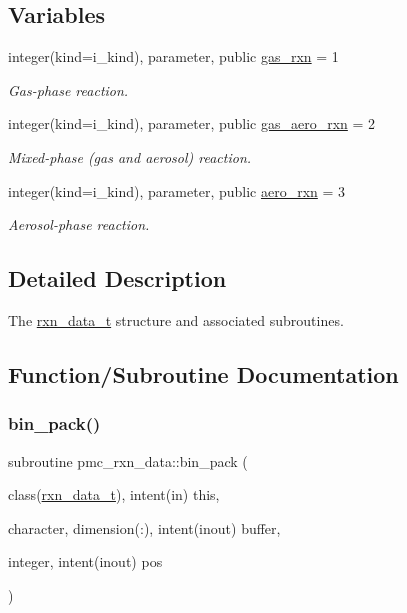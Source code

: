 \subsection*{Variables}
\begin{DoxyCompactItemize}
\item 
integer(kind=i\+\_\+kind), parameter, public \mbox{\hyperlink{namespacepmc__rxn__data_a111b121911199623f10770744af6488f}{gas\+\_\+rxn}} = 1
\begin{DoxyCompactList}\small\item\em Gas-\/phase reaction. \end{DoxyCompactList}\item 
integer(kind=i\+\_\+kind), parameter, public \mbox{\hyperlink{namespacepmc__rxn__data_aa70ce267bb3565e338327b106143ba5f}{gas\+\_\+aero\+\_\+rxn}} = 2
\begin{DoxyCompactList}\small\item\em Mixed-\/phase (gas and aerosol) reaction. \end{DoxyCompactList}\item 
integer(kind=i\+\_\+kind), parameter, public \mbox{\hyperlink{namespacepmc__rxn__data_a5f312af427a9f94444065a1fb53289ce}{aero\+\_\+rxn}} = 3
\begin{DoxyCompactList}\small\item\em Aerosol-\/phase reaction. \end{DoxyCompactList}\end{DoxyCompactItemize}


\subsection{Detailed Description}
The \mbox{\hyperlink{structpmc__rxn__data_1_1rxn__data__t}{rxn\+\_\+data\+\_\+t}} structure and associated subroutines. 

\subsection{Function/\+Subroutine Documentation}
\mbox{\label{namespacepmc__rxn__data_a397299ecd34b75d7ad2d796c4aceb359}} 
\subsubsection{\texorpdfstring{bin\+\_\+pack()}{bin\_pack()}}
{\footnotesize\ttfamily subroutine pmc\+\_\+rxn\+\_\+data\+::bin\+\_\+pack (\begin{DoxyParamCaption}\item[{class(\mbox{\hyperlink{structpmc__rxn__data_1_1rxn__data__t}{rxn\+\_\+data\+\_\+t}}), intent(in)}]{this,  }\item[{character, dimension(\+:), intent(inout)}]{buffer,  }\item[{integer, intent(inout)}]{pos }\end{DoxyParamCaption})\hspace{0.3cm}{\ttfamily [private]}}



